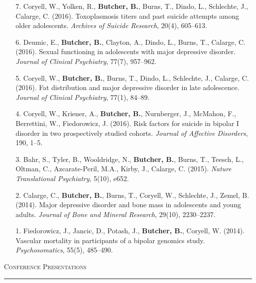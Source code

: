 \documentclass[a4paper]{article}
\begin{document}
\begin{enumerate}
  \item[7.] Coryell, W., Yolken, R., \textbf{Butcher, B.}, Burns, T., Dindo, L., Schlechte,
    J., Calarge, C. (2016). Toxoplasmosis titers and past suicide attempts among
    older adolescents. \textit{Archives of Suicide Research}, 20(4), 605--613.

  \item[6.] Deumic, E., \textbf{Butcher, B.}, Clayton, A., Dindo, L., Burns, T., Calarge,
    C. (2016). Sexual functioning in adolescents with major depressive disorder.
    \textit{Journal of Clinical Psychiatry}, 77(7), 957--962.

  \item[5.] Coryell, W., \textbf{Butcher, B.}, Burns, T., Dindo, L., Schlechte, J.,
    Calarge, C. (2016). Fat distribution and major depressive disorder in
    late adolescence. \textit{Journal of Clinical Psychiatry}, 77(1), 84--89.

  \item[4.] Coryell, W., Kriener, A., \textbf{Butcher, B.}, Nurnberger, J., McMahon, F.,
    Berrettini, W., Fiedorowicz, J. (2016). Risk factors for suicide in bipolar
    I disorder in two prospectively studied cohorts. \textit{Journal of Affective
    Disorders}, 190, 1--5.

  \item[3.] Bahr, S., Tyler, B., Wooldridge, N., \textbf{Butcher, B.}, Burns, T., Teesch, L.,
    Oltman, C., Azcarate-Peril, M.A., Kirby, J., Calarge, C. (2015).
    \textit{Nature Translational Psychiatry}, 5(10), e652.

  \item[2.] Calarge, C., \textbf{Butcher, B.}, Burns, T., Coryell, W., Schlechte, J., Zemel,
    B. (2014). Major depressive disorder and bone mass in adolescents and young
    adults. \textit{Journal of Bone and Mineral Research}, 29(10), 2230--2237.

  \item[1.] Fiedorowicz, J., Jancic, D., Potash, J., \textbf{Butcher, B.}, Coryell, W.
    (2014). Vascular mortality in participants of a bipolar genomics study.
    \textit{Psychosomatics}, 55(5), 485--490.

\end{enumerate}


\begin{flushleft}
  \Large\textsc{Conference Presentations}
  \textcolor{usafagrey}{\rule[0.5\baselineskip]{\textwidth}{0.75pt}}
\end{flushleft}
\vspace{-1.5\baselineskip}
\end{document}
